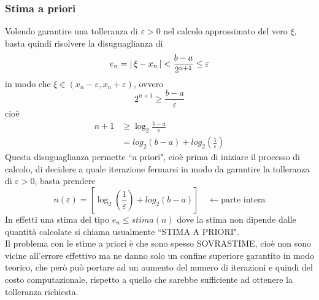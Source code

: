 \documentclass[12pt]{article}
\DeclarePairedDelimiter{\abs}{\lvert}{\rvert}
\begin{document}
\subsubsection{Stima a priori}
Volendo garantire una tolleranza di $\varepsilon > 0 $ nel calcolo approssimato del vero $\xi$, basta quindi risolvere la disuguaglianza di 
\[ e_n = \abs{\,\xi - x_n\,} < \frac{b-a}{2^{n+1}} \le \varepsilon \]
in modo che $\xi \in (x_n -  \varepsilon, x_n + \varepsilon)$, ovvero \[ 2^{n+1} \geq  \frac{b-a}{\varepsilon} \]
cioè
\[\begin{split}
   n + 1 & \ge \log_2{\frac{b-a}{\varepsilon}} \\
    & = log_2\left(b-a\right) + log_2\left(\frac{1}{\varepsilon}\right)
\end{split}\]
Questa disuguaglianza permette ``a priori", cioè prima di iniziare il processo di calcolo, di decidere a quale iterazione fermarsi in modo da garantire la tolleranza di $\varepsilon > 0$, basta prendere 
\[ n(\varepsilon) = [\log_2\left(\frac{1}{\varepsilon}\right) + log_2{(b-a)}] \quad \leftarrow \text{parte intera}\]
In effetti una stima del tipo $e_n \leq stima(n)$ dove la stima non dipende dalle quantità calcolate si chiama usualmente ``STIMA A PRIORI".\\
Il problema con le stime a priori è che sono spesso SOVRASTIME, cioè non sono vicine all'errore effettivo ma ne danno solo un confine superiore garantito in modo teorico, che però può portare ad un aumento del numero di iterazioni e quindi del costo computazionale, rispetto a quello che sarebbe sufficiente ad ottenere la tolleranza richiesta.
\end{document}
